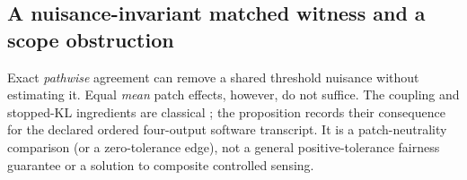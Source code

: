 \subsection{A nuisance-invariant matched witness and a scope obstruction}
\label{sec:unknown-shared-threshold}

Exact \emph{pathwise} agreement can remove a shared threshold nuisance without
estimating it. Equal \emph{mean} patch effects, however, do not suffice. The
coupling and stopped-KL ingredients are classical
\cite{GlassermanYao1992,NitinawaratAtiaVeeravalli2013}; the proposition records
their consequence for the declared ordered four-output software transcript.
It is a patch-neutrality comparison (or a zero-tolerance edge), not a general
positive-tolerance fairness guarantee or a solution to composite controlled
sensing.

